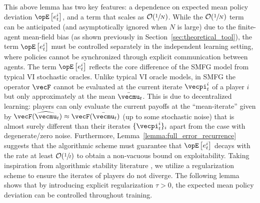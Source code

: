 This above lemma has two key features: a dependence on expected mean policy deviation $\Exop\left[e_t^i\right]$, and a term that scales as $\mathcal{O}(\sfrac{1}{N})$.
While the $\mathcal{O}(\sfrac{1}{N})$ term can be anticipated (and asymptotically ignored when $N$ is large) due to the finite-agent mean-field bias (as shown previously in Section~\ref{sec:theoretical_tool}), the term $\Exop\left[e_t^i\right]$ must be controlled separately in the independent learning setting, where policies cannot be synchronized through explicit communication between agents.
The term $\Exop\left[e_t^i\right]$ reflects the core difference of the SMFG model from typical VI stochastic oracles.
Unlike typical VI oracle models, in SMFG the operator $\vecF$ cannot be evaluated at the current iterate $\vecpi^i_t$ of a player $i$  but only approximately at the mean $\bar{\vecmu}_t$.
This is due to decentralized learning: players can only evaluate the current payoffs at the ``mean-iterate'' given by $\vecF(\widehat{\vecmu}_t) \approx \vecF(\bar{\vecmu}_t)$ (up to some stochastic noise) that is almost surely different than their iterates $\{\vecpi^i_t\}_i$ apart from the case with degenerate/zero noise.
Furthermore, Lemma~\ref{lemma:full_error_recurrence} suggests that the algorithmic scheme must guarantee that $\Exop\left[e_t^i\right]$ decays with the rate at least $\mathcal{O}(\sfrac{1}{t})$ to obtain a non-vacuous bound on exploitability.
Taking inspiration from algorithmic stability literature \citep{ahn2022reproducibility, zhang2024optimal}, we utilize a regularization scheme to ensure the iterates of players do not diverge.
The following lemma shows that by introducing explicit regularization $\tau>0$, the expected mean policy deviation can be controlled throughout training.



